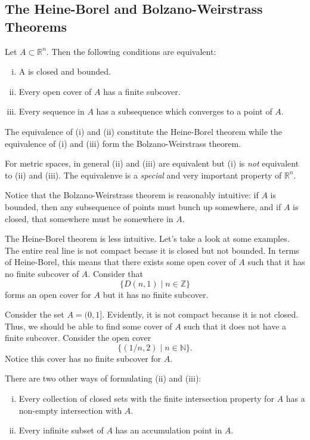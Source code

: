 \documentclass[11pt]{article}
\theoremstyle{definition}
\newcommand{\R}{\mathbb{R}}                      %
\begin{document}
\subsection{The Heine-Borel and Bolzano-Weirstrass Theorems}
\begin{shaded}
\theorem Let $A\subset \R^n$. Then the following conditions are equivalent:
    \begin{enumerate}[(i)]
        \item A is closed and bounded.
        \item Every open cover of $A$ has a finite subcover.
        \item Every sequence in $A$ has a subsequence which converges to a point of $A$.
    \end{enumerate}
The equivalence of (i) and (ii) constitute the Heine-Borel theorem while the equivalence of (i) and (iii) form the Bolzano-Weirstrass theorem.
\end{shaded}
\note For metric spaces, in general (ii) and (iii) are equivalent but (i) is \textit{not} equivalent to (ii) and (iii). The equivalenve is a \textit{special} and very important property of $\R^n$.

Notice that the Bolzano-Weirstrass theorem is reasonably intuitive: if $A$ is bounded, then any subsequence of points must bunch up somewhere, and if $A$ is closed, that somewhere must be somewhere in $A$.

The Heine-Borel theorem is less intuitive. Let's take a look at some examples.
\ex The entire real line is not compact becase it is closed but not bounded. In terms of Heine-Borel, this means that there exists some open cover of $A$ such that it has no finite subcover of $A$. Consider that 
$$
\{D(n,1)\; | \;n\in \mathbb{Z}\}
$$
forms an open cover for $A$ but it has no finite subcover.

\ex Consider the set $A=(0,1]$. Evidently, it is not compact because it is not closed. Thus, we should be able to find some cover of $A$ such that it does not have a finite subcover. Consider the open cover
$$
\{(1/n,2)\;|\; n\in\mathbb{N}\}.
$$
Notice this cover has no finite subcover for $A$.

There are two other ways of formulating (ii) and (iii):
\begin{enumerate}[(i)']
\addtocounter{enumi}{1}
    \item Every collection of closed sets with the finite intersection property for $A$ has a non-empty intersection with $A$.
    \item Every infinite subset of $A$ has an accumulation point in $A$.
\end{enumerate}
\end{document}

